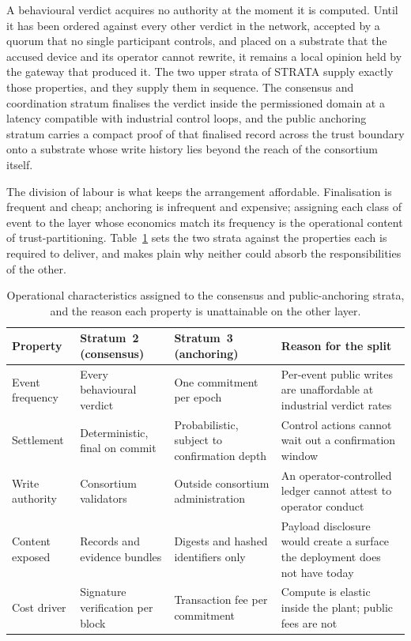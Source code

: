 A behavioural verdict acquires no authority at the moment it is computed. Until it has been ordered against every other verdict in the network, accepted by a quorum that no single participant controls, and placed on a substrate that the accused device and its operator cannot rewrite, it remains a local opinion held by the gateway that produced it. The two upper strata of STRATA supply exactly those properties, and they supply them in sequence. The consensus and coordination stratum finalises the verdict inside the permissioned domain at a latency compatible with industrial control loops, and the public anchoring stratum carries a compact proof of that finalised record across the trust boundary onto a substrate whose write history lies beyond the reach of the consortium itself.

The division of labour is what keeps the arrangement affordable. Finalisation is frequent and cheap; anchoring is infrequent and expensive; assigning each class of event to the layer whose economics match its frequency is the operational content of trust-partitioning. Table~\ref{tab:strata-upper} sets the two strata against the properties each is required to deliver, and makes plain why neither could absorb the responsibilities of the other.

\begin{table}[!htbp]
  \centering
  \footnotesize
  \setlength{\tabcolsep}{5pt}
  \renewcommand{\arraystretch}{1.3}
  \caption{Operational characteristics assigned to the consensus and public-anchoring strata, and the reason each property is unattainable on the other layer.}
  \label{tab:strata-upper}
  \begin{tabularx}{\textwidth}{@{}
      >{\raggedright\arraybackslash}p{2.9cm}
      >{\raggedright\arraybackslash}p{3.2cm}
      >{\raggedright\arraybackslash}p{3.2cm}
      >{\raggedright\arraybackslash}X@{}}
    \toprule
    \textbf{Property} & \textbf{Stratum~2 (consensus)} & \textbf{Stratum~3 (anchoring)} & \textbf{Reason for the split} \\
    \midrule
    Event frequency
      & Every behavioural verdict
      & One commitment per epoch
      & Per-event public writes are unaffordable at industrial verdict rates \\
    Settlement
      & Deterministic, final on commit
      & Probabilistic, subject to confirmation depth
      & Control actions cannot wait out a confirmation window \\
    Write authority
      & Consortium validators
      & Outside consortium administration
      & An operator-controlled ledger cannot attest to operator conduct \\
    Content exposed
      & Records and evidence bundles
      & Digests and hashed identifiers only
      & Payload disclosure would create a surface the deployment does not have today \\
    Cost driver
      & Signature verification per block
      & Transaction fee per commitment
      & Compute is elastic inside the plant; public fees are not \\
    \bottomrule
  \end{tabularx}
\end{table}

